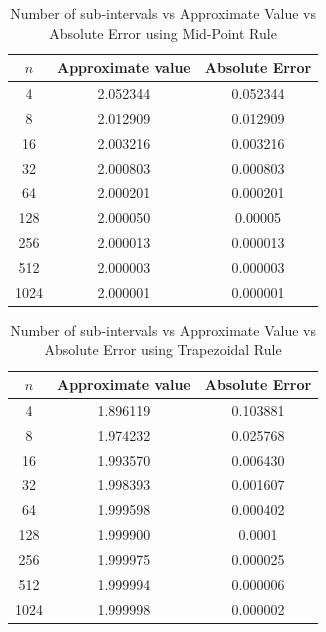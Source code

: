 \documentclass[titlepage, 11pt]{article}
\begin{document}
\begin{table}[!htb]
    \caption{Number of sub-intervals vs Approximate Value vs Absolute Error using Mid-Point Rule}
    \centering
    \begin{tabular}{ccc}
    \toprule
    \textbf{$n$}& \textbf{Approximate value}& \textbf{Absolute Error}   \\
    \midrule
         4	& 2.052344	& 0.052344 \\
         8	& 2.012909	&  0.012909 \\
         16	& 2.003216	& 0.003216 \\
         32	& 2.000803	& 0.000803 \\
         64	 & 2.000201	& 0.000201 \\
         128 &	 2.000050 & 0.00005 \\
         256 &  2.000013 &	 0.000013 \\
         512 & 2.000003 &	 0.000003 \\
         1024	& 2.000001 &	 0.000001 \\ 
    \bottomrule
    \end{tabular}
    \label{tab:tab1a}
\end{table}
\begin{table}[!htb]
    \caption{Number of sub-intervals vs Approximate Value vs Absolute Error using Trapezoidal Rule}
    \centering
    \begin{tabular}{ccc}
    \toprule
    \textbf{$n$}& \textbf{Approximate value}& \textbf{Absolute Error}   \\
    \midrule
        4 &  1.896119 & 0.103881 \\
        8 & 1.974232 & 0.025768\\
16	& 1.993570	 & 0.006430 \\
32	& 1.998393	 & 0.001607 \\
64	& 1.999598	 & 0.000402 \\
128	& 1.999900	 & 0.0001 \\
256	& 1.999975	 & 0.000025 \\ 
512	& 1.999994	& 0.000006 \\
1024 &	 1.999998	& 0.000002 \\
    \bottomrule
    \end{tabular}
    \label{tab:tab1b}
\end{table}
\end{document}
